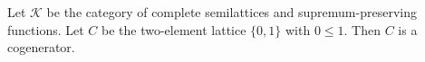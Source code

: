 Let $\mathcal{K}$ be the category of complete semilattices and supremum-preserving functions. Let $C$ be the two-element lattice $\{0, 1\}$ with $0 \leqslant 1$. Then $C$ is a cogenerator.
